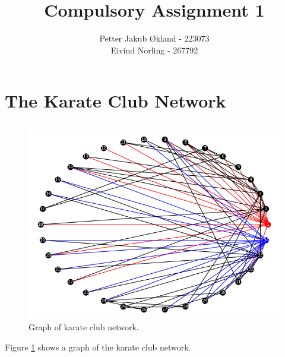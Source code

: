 \documentclass[11pt]{article}
\title{ Compulsory Assignment 1}
\author{ Petter Jakub Økland - 223073\\
Eivind Norling - 267792}
\begin{document}
\maketitle

\section{The Karate Club Network}
\subsection{}
\begin{figure}
  \includegraphics[width=\linewidth]{Figure_1.png}
  \caption{Graph of karate club network.}
  \label{fig:graph model}
\end{figure}

Figure \ref{fig:graph model} shows a graph of the karate club network.
\end{document}
